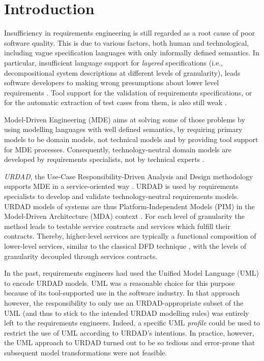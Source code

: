 \section{Introduction}
Insufficiency in requirements engineering is still regarded as a root cause of poor software quality. This is due to 
various factors, both human and technological, including vague specification languages with only informally defined 
semantics. In particular, insufficient language support for \emph{layered} specifications (i.e., decompositional system descriptions at different levels of granularity), leads software developers to making wrong presumptions about lower level requirements \cite{espana_evaluating_2009}. Tool support for the validation of requirements specifications, or for the automatic extraction of test cases from them, is also still weak \cite{bashardoust-tajali_extracting_2008}.

Model-Driven Engineering (MDE) \cite{schmidt_model_2006} aims at solving some of those problems by using modelling languages with well defined semantics, by requiring primary models to be domain models, not technical models \cite{asnina_computation_2010} and by providing tool support for MDE processes. Consequently, technology-neutral domain models are developed by requirements specialists, not by technical experts \cite{asnina_computation_2010}.

\emph{URDAD}, the Use-Case Responsibility-Driven Analysis and Design methodology \cite{fritz_solms_technology_2007} supports MDE in a service-oriented way \cite{solms_urdad_2010}. URDAD is used by requirements specialists to develop and validate technology-neutral requirements models. URDAD models of systems are thus Platform-Independent Models (PIM) in the Model-Driven Architecture (MDA) context \cite{solms_urdad_2010}. For each level of granularity the method leads to testable service contracts and services which fulfill their contracts. Thereby, higher-level services are typically a functional composition of lower-level services, similar to the classical DFD technique \cite{DeMarco}, with the levels of granularity decoupled through services contracts. 

In the past, requirements engineers had used the Unified Model Language (UML) to encode URDAD models. UML was a reasonable choice for this purpose because of its tool-supported use in the software industry. In that approach however, the responsibility to only use an URDAD-appropriate subset of the UML (and thus to stick to the intended URDAD modelling rules) was entirely left to the requirements engineers. Indeed, a specific UML \emph{profile} could be used to restrict the use of UML according to URDAD's intentions. In practice, however, the UML approach to URDAD turned out to be so tedious and error-prone that subsequent model transformations were not feasible.

